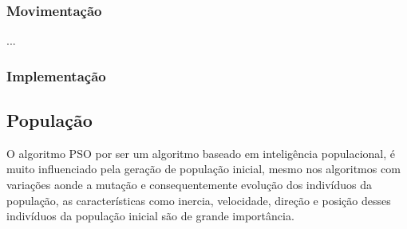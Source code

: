         \subsubsection{Movimentação}
            ...
        

        \subsubsection{Implementação}





    \subsection{População}
        O algoritmo PSO por ser um algoritmo baseado em inteligência populacional, é muito influenciado pela geração de população inicial, mesmo nos algoritmos com variações aonde a mutação e consequentemente evolução dos indivíduos da população, as características como inercia, velocidade, direção e posição desses indivíduos da população inicial são de grande importância.\newline


